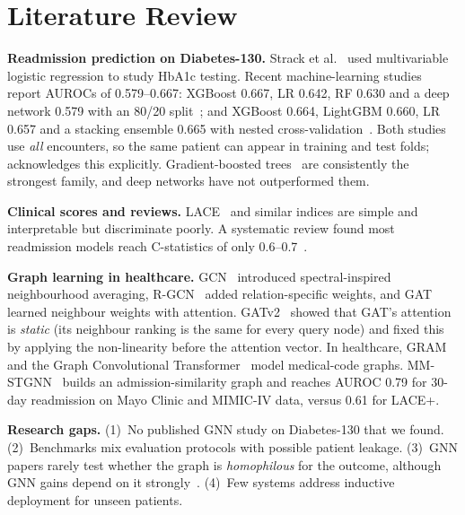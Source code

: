 \documentclass[conference]{IEEEtran}
\begin{document}
\section{Literature Review}
\textbf{Readmission prediction on Diabetes-130.} Strack et al.~\cite{strack2014} used
multivariable logistic regression to study HbA1c testing. Recent machine-learning studies
report AUROCs of 0.579--0.667: XGBoost 0.667, LR 0.642, RF 0.630 and a deep network 0.579 with
an 80/20 split~\cite{emijohnson2025}; and XGBoost 0.664, LightGBM 0.660, LR 0.657 and a stacking
ensemble 0.665 with nested cross-validation~\cite{salim2026}. Both studies use \emph{all}
encounters, so the same patient can appear in training and test folds; \cite{salim2026}
acknowledges this explicitly. Gradient-boosted trees~\cite{chen2016,ke2017} are consistently the
strongest family, and deep networks have not outperformed them.

\textbf{Clinical scores and reviews.} LACE~\cite{vanwalraven2010} and similar indices are
simple and interpretable but discriminate poorly. A systematic review found most readmission
models reach C-statistics of only 0.6--0.7~\cite{kansagara2011}.

\textbf{Graph learning in healthcare.} GCN~\cite{kipf2017} introduced spectral-inspired
neighbourhood averaging, R-GCN~\cite{schlichtkrull2018} added relation-specific weights, and
GAT~\cite{velickovic2018} learned neighbour weights with attention. GATv2~\cite{brody2022}
showed that GAT's attention is \emph{static} (its neighbour ranking is the same for every query
node) and fixed this by applying the non-linearity before the attention vector. In healthcare,
GRAM~\cite{choi2017} and the Graph Convolutional Transformer~\cite{choi2020} model medical-code
graphs. MM-STGNN~\cite{tang2023} builds an admission-similarity graph and reaches AUROC 0.79 for
30-day readmission on Mayo Clinic and MIMIC-IV data, versus 0.61 for LACE+.

\textbf{Research gaps.} (1)~No published GNN study on Diabetes-130 that we found.
(2)~Benchmarks mix evaluation protocols with possible patient leakage. (3)~GNN papers rarely
test whether the graph is \emph{homophilous} for the outcome, although GNN gains depend on it
strongly~\cite{zhu2020}. (4)~Few systems address inductive deployment for unseen patients.

\end{document}
